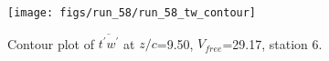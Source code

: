 \begin{figure}[H]
\centering
\texttt{[image: figs/run\_58/run\_58\_tw\_contour]}
\caption{Contour plot of $\overline{t^\prime w^\prime}$ at $z/c$=9.50, $V_{free}$=29.17, station 6.}
\end{figure}


